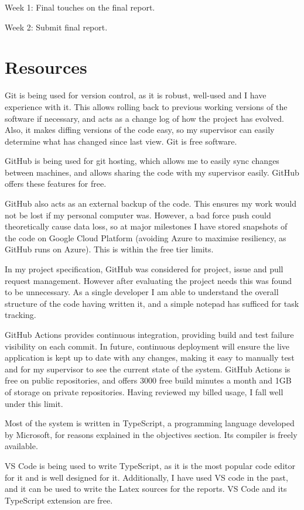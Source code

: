 \documentclass[a4paper,fleqn,12pt]{article}
\begin{document}
Week 1: Final touches on the final report.

Week 2: Submit final report.

\section{Resources}\label{id:h.8b8ghk7r824a}

Git is being used for version control, as it is robust, well-used and I have experience with it. This allows rolling back to previous working versions of the software if necessary, and acts as a change log of how the project has evolved. Also, it makes diffing versions of the code easy, so my supervisor can easily determine what has changed since last view. Git is free software.

GitHub is being used for git hosting, which allows me to easily sync changes between machines, and allows sharing the code with my supervisor easily. GitHub offers these features for free.

GitHub also acts as an external backup of the code. This ensures my work would not be lost if my personal computer was. However, a bad force push could theoretically cause data loss, so at major milestones I have stored snapshots of the code on Google Cloud Platform (avoiding Azure to maximise resiliency, as GitHub runs on Azure). This is within the free tier limits.

In my project specification, GitHub was considered for project, issue and pull request management. However after evaluating the project needs this was found to be unnecessary. As a single developer I am able to understand the overall structure of the code having written it, and a simple notepad has sufficed for task tracking.

GitHub Actions provides continuous integration, providing build and test failure visibility on each commit. In future, continuous deployment will ensure the live application is kept up to date with any changes, making it easy to manually test and for my supervisor to see the current state of the system. GitHub Actions is free on public repositories, and offers 3000 free build minutes a month and 1GB of storage on private repositories. Having reviewed my billed usage, I fall well under this limit.

Most of the system is written in TypeScript, a programming language developed by Microsoft, for reasons explained in the objectives section. Its compiler is freely available.

VS Code is being used to write TypeScript, as it is the most popular code editor for it and is well designed for it. Additionally, I have used VS code in the past, and it can be used to write the Latex sources for the reports. VS Code and its TypeScript extension are free.
\end{document}

